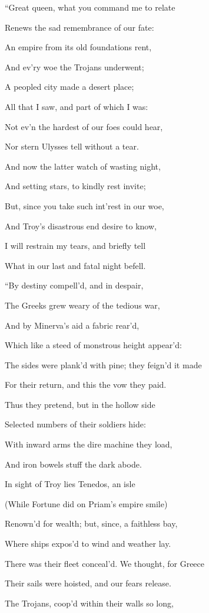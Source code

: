 “Great queen, what you command me to relate

Renews the sad remembrance of our fate:

An empire from its old foundations rent,

And ev’ry woe the Trojans underwent;

A peopled city made a desert place;

All that I saw, and part of which I was:

Not ev’n the hardest of our foes could hear,

Nor stern Ulysses tell without a tear.

And now the latter watch of wasting night,

And setting stars, to kindly rest invite;

But, since you take such int’rest in our woe,

And Troy’s disastrous end desire to know,

I will restrain my tears, and briefly tell

What in our last and fatal night befell.

“By destiny compell’d, and in despair,

The Greeks grew weary of the tedious war,

And by Minerva’s aid a fabric rear’d,

Which like a steed of monstrous height appear’d:

The sides were plank’d with pine; they feign’d it made

For their return, and this the vow they paid.

Thus they pretend, but in the hollow side

Selected numbers of their soldiers hide:

With inward arms the dire machine they load,

And iron bowels stuff the dark abode.

In sight of Troy lies Tenedos, an isle

(While Fortune did on Priam’s empire smile)

Renown’d for wealth; but, since, a faithless bay,

Where ships expos’d to wind and weather lay.

There was their fleet conceal’d. We thought, for Greece

Their sails were hoisted, and our fears release.

The Trojans, coop’d within their walls so long,

